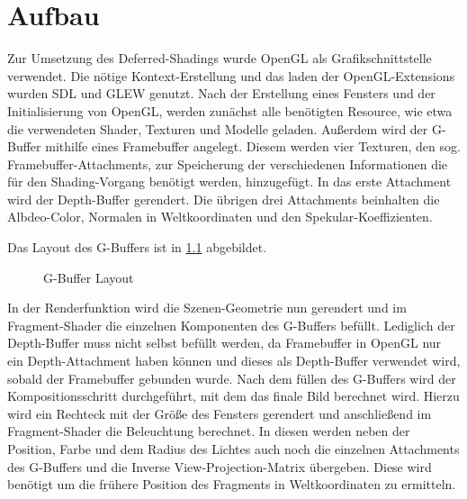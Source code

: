 \chapter{Aufbau}
Zur Umsetzung des Deferred-Shadings wurde OpenGL als Grafikschnittstelle verwendet. Die nötige Kontext-Erstellung und das laden der OpenGL-Extensions wurden SDL und GLEW genutzt. Nach der Erstellung eines Fensters und der Initialisierung von OpenGL, werden zunächst alle benötigten Resource, wie etwa die verwendeten Shader, Texturen und Modelle geladen. Außerdem wird der G-Buffer mithilfe eines Framebuffer angelegt. Diesem werden vier Texturen, den sog. Framebuffer-Attachments, zur Speicherung der verschiedenen Informationen die für den Shading-Vorgang benötigt werden, hinzugefügt. In das erste Attachment wird der Depth-Buffer gerendert. Die übrigen drei Attachments beinhalten die Albdeo-Color, Normalen in Weltkoordinaten und den Spekular-Koeffizienten.

Das Layout des G-Buffers ist in \ref{fig:gbuffer} abgebildet.

\begin{figure}
\center
{}
\caption{G-Buffer Layout}
\label{fig:gbuffer}
\end{figure}

In der Renderfunktion wird die Szenen-Geometrie nun gerendert und im Fragment-Shader die einzelnen Komponenten des G-Buffers befüllt. Lediglich der Depth-Buffer muss nicht selbst befüllt werden, da Framebuffer in OpenGL nur ein Depth-Attachment haben können und dieses als Depth-Buffer verwendet wird, sobald der Framebuffer gebunden wurde. Nach dem füllen des G-Buffers wird der Kompositionsschritt durchgeführt, mit dem das finale Bild berechnet wird. Hierzu wird ein Rechteck mit der Größe des Fensters gerendert und anschließend im Fragment-Shader die Beleuchtung berechnet. In diesen werden neben der Position, Farbe und dem Radius des Lichtes auch noch die einzelnen Attachments des G-Buffers und die Inverse View-Projection-Matrix übergeben. Diese wird benötigt um die frühere Position des Fragments in Weltkoordinaten zu ermitteln.

